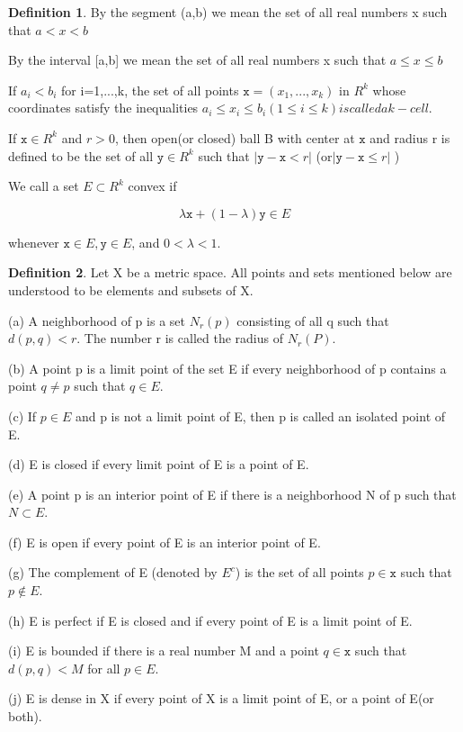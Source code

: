 \documentclass{article}
\theoremstyle{definition}
\newtheorem{defi}{Definition}
\theoremstyle{remark}
\begin{document}
	\begin{defi}
		By the segment (a,b) we mean the set of all real numbers x such that $a<x<b$
		
		By the interval [a,b] we mean the set of all real numbers x such that $a\le x\le b$
		
		If $a_i<b_i$ for i=1,...,k, the set of all points $\mathtt{x}=(x_1,...,x_k)$ in $R^k$ whose coordinates satisfy the inequalities $a_i\le x_i\le b_i(1\le i\le k) is called a k-cell$.
		
		If $\mathtt{x}\in R^k$ and $r>0$, then open(or closed) ball B with center at $\mathtt{x}$ and radius r is defined to be the set of all $\mathtt{y}\in R^k$ such that $|\mathtt{y}-\mathtt{x}<r|$  (or$|\mathtt{y}-\mathtt{x}\le r|$ )
		
		We call a set $E\subset R^k$ convex if 
		
		\[
		\lambda \mathtt{x} +(1-\lambda)\mathtt{y}\in E
		\]
		
		whenever $\mathtt{x}\in E,\mathtt{y}\in E$, and $0<\lambda <1$.
		
	\end{defi}
	
	\begin{defi}
	Let X be a metric space. All points and sets mentioned below are understood to be elements and subsets of X.
	
	(a) A neighborhood of p is a set $N_r(p)$ consisting of all q such that $d(p,q)<r$. The number r is called the radius of $N_r(P)$.
	
	(b) A point p is a limit point of the set E if every neighborhood of p contains a point $q\ne p$ such that $q\in E$.
	
	(c) If $p\in E$ and p is not a limit point of E, then p is called an isolated point of E.
	
	(d) E is closed if every limit point of E is a point of E.
	
	(e) A point p is an interior point of E if there is a neighborhood N of p such that $N\subset E$.
	
	(f) E is open if every point of E is an interior point of E.
	
	(g) The complement of E (denoted by $E^c$) is the set of all points $p\in \mathtt{x}$ such that $p\notin E$.
	
	(h) E is perfect if E is closed and if every point of E is a limit point of E.
	
	(i) E is bounded if there is a real number M and a point $q\in \mathtt{x}$ such that $d(p,q)<M$ for all $p\in E$.
	
 	(j) E is dense in X if every point of X is a limit point of E, or a point of E(or both).
 	
	\end{defi}
	
\end{document}
